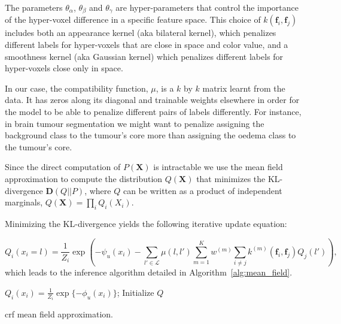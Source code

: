\documentclass{article}
\begin{document}
The parameters $\theta_\alpha$, $\theta_\beta$ and $\theta_\gamma$ are hyper-parameters that control the importance of the hyper-voxel difference in a specific feature space.
This choice of $k(\textbf{f}_i, \textbf{f}_j)$ includes both an appearance kernel (aka bilateral kernel), which penalizes different labels for hyper-voxels that are close in space and color value, and a smoothness kernel (aka Gaussian kernel) which penalizes different labels for hyper-voxels close only in space.

In our case, the compatibility function, $\mu$, is a $k$ by $k$ matrix learnt from the data.
It has zeros along its diagonal and trainable weights elsewhere in order for the model to be able to penalize different pairs of labels differently.
For instance, in brain tumour segmentation we might want to penalize assigning the background class to the tumour's core more than assigning the oedema class to the tumour's core.

Since the direct computation of $P(\textbf{X})$ is intractable we use the mean field approximation to compute the distribution $Q(\textbf{X})$ that minimizes the KL-divergence $\textbf{D}(Q||P)$, where $Q$ can be written as a product of independent marginals, $Q(\textbf{X})=\prod_i Q_i(X_i)$.

Minimizing the KL-divergence yields the following iterative update equation:

\begin{equation}
    Q_i(x_i=l) = \frac{1}{Z_i}\exp{\left ( -\psi_u(x_i) - \sum_{l' \in \mathcal{L}}\mu(l, l') \sum_{m=1}^{K}w^{(m)} \sum_{i \neq j} k^{(m)}(\textbf{f}_i, \textbf{f}_j) Q_j(l')\right )},
\end{equation}
which leads to the inference algorithm detailed in Algorithm~\ref{alg:mean_field}.

\begin{algorithm}
\SetAlgoLined
 $Q_i(x_i) = \frac{1}{Z_i}\exp\{-\phi_u(x_i)\}$;  \hfill Initialize $Q$ 
 
 \caption{\gls{crf} mean field approximation.}
 \label{alg:mean_field}
\end{algorithm}
\end{document}
